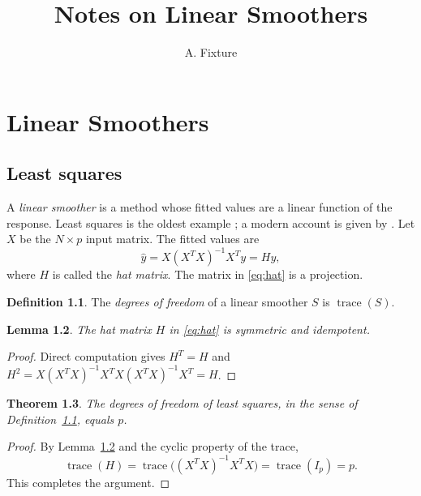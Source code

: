 \documentclass[11pt]{book}
\newtheorem{theorem}{Theorem}[chapter]
\newtheorem{lemma}[theorem]{Lemma}
\theoremstyle{definition}
\newtheorem{definition}[theorem]{Definition}
\numberwithin{equation}{chapter}
\begin{document}
\frontmatter
\title{Notes on Linear Smoothers}
\author{A. Fixture}
\maketitle
\tableofcontents
\mainmatter
\chapter{Linear Smoothers}
\section{Least squares}
A \emph{linear smoother} is a method whose fitted values are a linear function of the response.
Least squares is the oldest example \citep{gauss1809}; a modern account is given by \citet{hastie2009}.
Let $X$ be the $N\times p$ input matrix. The fitted values are
\begin{equation}\label{eq:hat}
\hat y = X (X^T X)^{-1} X^T y = H y ,
\end{equation}
where $H$ is called the \emph{hat matrix}. The matrix in \eqref{eq:hat} is a projection.
\begin{definition}\label{def:df}
The \emph{degrees of freedom} of a linear smoother $S$ is $\operatorname{trace}(S)$.
\end{definition}
\begin{lemma}\label{lem:idem}
The hat matrix $H$ in \eqref{eq:hat} is symmetric and idempotent.
\end{lemma}
\begin{proof}
Direct computation gives $H^T = H$ and $H^2 = X (X^TX)^{-1} X^T X (X^TX)^{-1} X^T = H$.
\end{proof}
\begin{theorem}\label{thm:df}
The degrees of freedom of least squares, in the sense of Definition~\ref{def:df}, equals $p$.
\end{theorem}
\begin{proof}
By Lemma~\ref{lem:idem} and the cyclic property of the trace,
\begin{equation}\label{eq:trace}
\operatorname{trace}(H) = \operatorname{trace}\big((X^TX)^{-1} X^T X\big) = \operatorname{trace}(I_p) = p .
\end{equation}
This completes the argument.
\end{proof}
\end{document}
